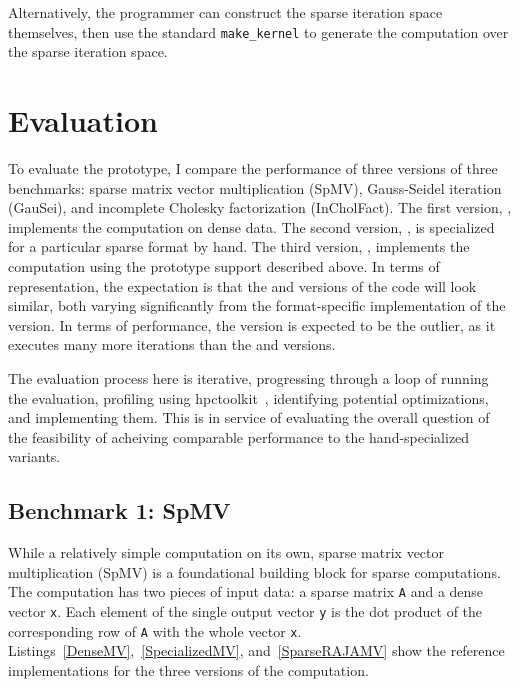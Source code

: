 Alternatively, the programmer can construct the sparse iteration space themselves, then use the standard \verb.make_kernel. to generate the computation over the sparse iteration space.

\section{Evaluation}
\label{sec:sparseEval}
To evaluate the prototype, I compare the performance of three versions of three benchmarks: sparse matrix vector multiplication (SpMV), Gauss-Seidel iteration (GauSei), and incomplete Cholesky factorization (InCholFact).
The first version, \dense, implements the computation on dense data. 
The second version, \specialized, is specialized for a particular sparse format by hand. 
The third version, \sparseraja, implements the computation using the prototype support described above.
In terms of representation, the expectation is that the \dense{} and \sparseraja{} versions of the code will look similar, both varying significantly from the format-specific implementation of the \specialized{} version.
In terms of performance, the \dense{} version is expected to be the outlier, as it executes many more iterations than the \sparseraja{} and \specialized{} versions.

The evaluation process here is iterative, progressing through a loop of running the evaluation, profiling using hpctoolkit~\cite{todo}, identifying potential optimizations, and implementing them. 
This is in service of evaluating the overall question of the feasibility of acheiving comparable performance to the hand-specialized variants.





\subsection{Benchmark 1: SpMV}
While a relatively simple computation on its own, sparse matrix vector multiplication (SpMV) is a foundational building block for sparse computations.
The computation has two pieces of input data: a sparse matrix \verb.A. and a dense vector \verb.x.. 
Each element of the single output vector \verb.y. is the dot product of the corresponding row of \verb.A. with the whole vector \verb.x..
Listings~\ref{DenseMV},~\ref{SpecializedMV}, and~\ref{SparseRAJAMV} show the reference implementations for the three versions of the computation.


